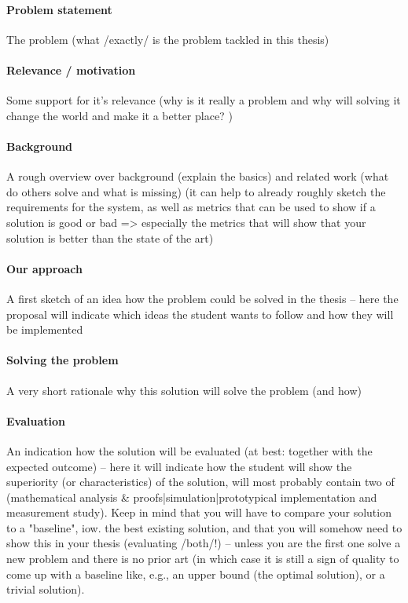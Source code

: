 \documentclass{article}
\begin{document}
\paragraph{Problem statement}
The problem (what /exactly/ is the problem tackled in this thesis)

\paragraph{Relevance / motivation}
Some support for it's relevance (why is it really a problem and why will solving it change the world and make it a better place? )

\paragraph{Background}
A rough overview over background (explain the basics) and related work (what do others solve and what is missing) (it can help to already roughly sketch the requirements for the system, as well as metrics that can be used to show if a solution is good or bad => especially the metrics that will show that your solution is better than the state of the art)

\paragraph{Our approach}
A first sketch of an idea how the problem could be solved in the thesis -- here the proposal will indicate which ideas the student wants to follow and how they will be implemented

\paragraph{Solving the problem}
A very short rationale why this solution will solve the problem (and how)

\paragraph{Evaluation}
An indication how the solution will be evaluated (at best: together with the expected outcome) -- here it will indicate how the student will show the superiority (or characteristics) of the solution, will most probably contain two of (mathematical analysis \& proofs|simulation|prototypical implementation and measurement study). Keep in mind that you will have to compare your solution to a "baseline", iow. the best existing solution, and that you will somehow need to show this in your thesis (evaluating /both/!) -- unless you are the first one solve a new problem and there is no prior art (in which case it is still a sign of quality to come up with a baseline like, e.g., an upper bound (the optimal solution), or a trivial solution).
\end{document}
